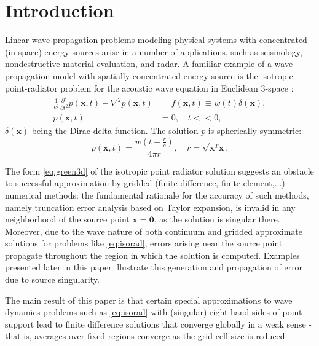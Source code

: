 \section{Introduction}

Linear wave propagation problems modeling physical systems with
concentrated (in space) energy sources arise in a number of
applications, such as seismology, nondestructive material evaluation,
and radar. A familiar example of a wave propagation model with
spatially concentrated 
energy
source is the isotropic point-radiator problem
for the acoustic wave equation in Euclidean 3-space \cite[]{CourHil:62}:
\begin{equation}\label{eq:isorad}
\begin{split}
       \frac{1}{c^2} \frac{\partial^2}{\partial t^2} p(\mathbf x,t) - \nabla^2
  p(\mathbf x,t) & = f(\mathbf x,t) \equiv w(t)\delta(\mathbf x),\\ 
p(\mathbf x,t) & =  0,  \quad t<<0,
\end{split}
\end{equation}
$\delta(\mathbf x)$ being the Dirac delta function.
The solution $p$ is spherically symmetric:
\begin{equation}
\label{eq:green3d}
	p(\mathbf x,t) = \frac{w\left(t-\frac{r}{c}\right)}{4\pi r}, \quad 
	r= \sqrt{\mathbf x^T \mathbf x}.
\end{equation}


The form \ref{eq:green3d} of the isotropic point radiator solution
suggests an obstacle to successful  approximation by gridded (finite
difference, finite element,...) numerical methods: the fundamental
rationale for the accuracy of such methods, namely truncation error
analysis based on Taylor expansion, is invalid in any neighborhood of
the source point $\mathbf x = \mathbf 0$, as the solution is singular
there. Moreover, due to the wave nature of both continuum and gridded
approximate solutions for problems like \ref{eq:isorad}, errors
arising near the source point propagate throughout the region in which
the solution is computed. Examples presented later in this paper
illustrate this generation and propagation of error due to source singularity. 

The main result of this paper is that certain special approximations
to wave dynamics problems such as \ref{eq:isorad} with (singular)
right-hand sides of point support lead to finite difference solutions
that converge globally in a weak sense - that is, averages over fixed
regions converge as the grid cell size is reduced.

